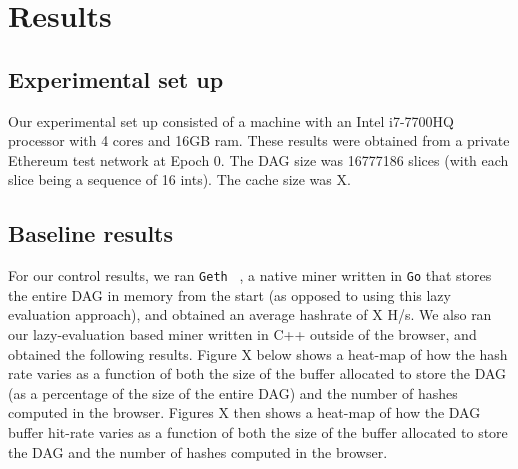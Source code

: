 \documentclass[10pt, conference, compsocconf]{IEEEtran}
\begin{document}
\section{Results}
\subsection{Experimental set up}
Our experimental set up consisted of a machine with an Intel i7-7700HQ processor with 4 cores and 16GB ram. These results were obtained from a private Ethereum test network at Epoch 0. The DAG size was 16777186 slices (with each slice being a sequence of 16 ints). The cache size was X.

\subsection{Baseline results}
For our control results, we ran \verb|Geth| ~\cite{geth}, a native miner written in \verb|Go| that stores the entire DAG in memory from the start (as opposed to using this lazy evaluation approach), and obtained an average hashrate of X H/s. We also ran our lazy-evaluation based miner written in C++ outside of the browser, and obtained the following results. 
Figure X below shows a heat-map of how the hash rate varies as a function of both the size of the buffer allocated to store the DAG (as a percentage of the size of the entire DAG) and the number of hashes computed in the browser. Figures X then shows a heat-map of how the DAG buffer hit-rate varies as a function of both the size of the buffer allocated to store the DAG and the number of hashes computed in the browser. 


\end{document}
